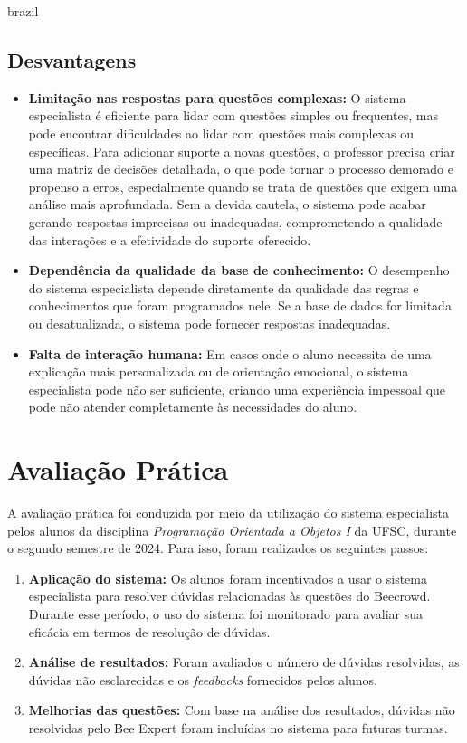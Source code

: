 \begin{otherlanguage*}{brazil}
\subsection{Desvantagens}
\begin{itemize}
	\item \textbf{Limitação nas respostas para questões complexas:} O sistema especialista é eficiente para lidar com questões simples ou frequentes, mas pode encontrar dificuldades ao lidar com questões mais complexas ou específicas. Para adicionar suporte a novas questões, o professor precisa criar uma matriz de decisões detalhada, o que pode tornar o processo demorado e propenso a erros, especialmente quando se trata de questões que exigem uma análise mais aprofundada. Sem a devida cautela, o sistema pode acabar gerando respostas imprecisas ou inadequadas, comprometendo a qualidade das interações e a efetividade do suporte oferecido.
    \item \textbf{Dependência da qualidade da base de conhecimento:} O desempenho do sistema especialista depende diretamente da qualidade das regras e conhecimentos que foram programados nele. Se a base de dados for limitada ou desatualizada, o sistema pode fornecer respostas inadequadas.
    \item \textbf{Falta de interação humana:} Em casos onde o aluno necessita de uma explicação mais personalizada ou de orientação emocional, o sistema especialista pode não ser suficiente, criando uma experiência impessoal que pode não atender completamente às necessidades do aluno.
\end{itemize}

\section{Avaliação Prática}

A avaliação prática foi conduzida por meio da utilização do sistema especialista pelos alunos da disciplina \textit{Programação Orientada a Objetos I} da UFSC, durante o segundo semestre de 2024. Para isso, foram realizados os seguintes passos:

\begin{enumerate}
    \item \textbf{Aplicação do sistema:} Os alunos foram incentivados a usar o sistema especialista para resolver dúvidas relacionadas às questões do Beecrowd. Durante esse período, o uso do sistema foi monitorado para avaliar sua eficácia em termos de resolução de dúvidas.
    \item \textbf{Análise de resultados:} Foram avaliados o número de dúvidas resolvidas, as dúvidas não esclarecidas e os \textit{feedbacks} fornecidos pelos alunos.
    \item \textbf{Melhorias das questões:} Com base na análise dos resultados, dúvidas não resolvidas pelo Bee Expert foram incluídas no sistema para futuras turmas.
\end{enumerate}


\end{otherlanguage*}
